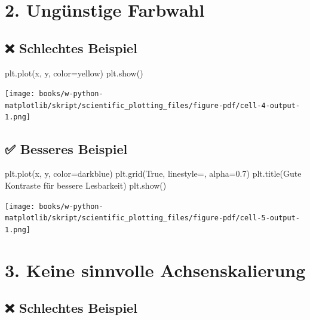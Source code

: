 \documentclass[
  letterpaper,
  DIV=11,
  numbers=noendperiod]{scrreprt}
\newenvironment{Shaded}{\begin{snugshade}}{\end{snugshade}}
\newcommand{\FloatTok}[1]{\textcolor[rgb]{0.68,0.00,0.00}{#1}}
\newcommand{\NormalTok}[1]{\textcolor[rgb]{0.00,0.23,0.31}{#1}}
\newcommand{\OperatorTok}[1]{\textcolor[rgb]{0.37,0.37,0.37}{#1}}
\newcommand{\StringTok}[1]{\textcolor[rgb]{0.13,0.47,0.30}{#1}}
\newcommand{\VariableTok}[1]{\textcolor[rgb]{0.07,0.07,0.07}{#1}}
\begin{document}
\section{2. Ungünstige Farbwahl}\label{unguxfcnstige-farbwahl}

\subsection{❌ Schlechtes Beispiel}\label{schlechtes-beispiel-1}

\begin{Shaded}
\begin{Highlighting}[]
\NormalTok{plt.plot(x, y, color}\OperatorTok{=}\StringTok{\textquotesingle{}yellow\textquotesingle{}}\NormalTok{)}
\NormalTok{plt.show()}
\end{Highlighting}
\end{Shaded}

\texttt{[image: books/w-python-matplotlib/skript/scientific\_plotting\_files/figure-pdf/cell-4-output-1.png]}

\subsection{✅ Besseres Beispiel}\label{besseres-beispiel-1}

\begin{Shaded}
\begin{Highlighting}[]
\NormalTok{plt.plot(x, y, color}\OperatorTok{=}\StringTok{\textquotesingle{}darkblue\textquotesingle{}}\NormalTok{)}
\NormalTok{plt.grid(}\VariableTok{True}\NormalTok{, linestyle}\OperatorTok{=}\StringTok{\textquotesingle{}{-}{-}\textquotesingle{}}\NormalTok{, alpha}\OperatorTok{=}\FloatTok{0.7}\NormalTok{)}
\NormalTok{plt.title(}\StringTok{\textquotesingle{}Gute Kontraste für bessere Lesbarkeit\textquotesingle{}}\NormalTok{)}
\NormalTok{plt.show()}
\end{Highlighting}
\end{Shaded}

\texttt{[image: books/w-python-matplotlib/skript/scientific\_plotting\_files/figure-pdf/cell-5-output-1.png]}

\section{3. Keine sinnvolle
Achsenskalierung}\label{keine-sinnvolle-achsenskalierung}

\subsection{❌ Schlechtes Beispiel}\label{schlechtes-beispiel-2}
\end{document}
